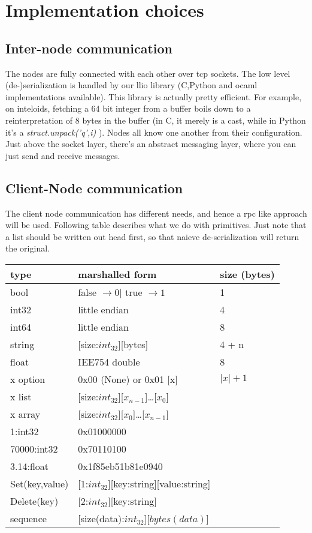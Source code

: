 \section{Implementation choices}
\subsection{Inter-node communication}
The nodes are fully connected with each other over tcp sockets.
The low level (de-)serialization is handled by our llio library (C,Python and ocaml implementations available).
This library is actually pretty efficient.
For example, on inteloids, fetching a 64 bit integer from a buffer boils down to a reinterpretation of 8 bytes in the buffer (in C, it merely is a cast, while in Python it's a \emph{struct.unpack('q',i)} ).
Nodes all know one another from their configuration.
Just above the socket layer, there's an abstract messaging layer, where you can just send and receive messages.



\subsection{Client-Node communication}
The client node communication has different needs, and hence a rpc like approach will be used. Following table describes what we do with primitives.
Just note that a list should be written out head first, so that naieve de-serialization will return the original.
\begin{table}[ht]
\begin{tabular}{|l|l|l|}
\hline
type  &   marshalled form & size (bytes)          \\
\hline
bool        & false $\rightarrow 0 | $ true $ \rightarrow 1   $ & 1 \\
int32       & little endian          & 4             \\
int64       & little endian          & 8             \\
string      & [size:$int_{32}$][bytes] & 4 + n     \\
float       & IEE754 double       & 8             \\
x option    & 0x00 (None) or 0x01 [x] & $|x| + 1$ \\
x list      & [size:$int_{32}$][$x_{n-1}$]\ldots[$x_{0}$]       &\\
x array     & [size:$int_{32}$][$x_{0}$]\ldots[$x_{n-1}$]       &\\
\hline 
1:int32     & 0x01000000         & \\
70000:int32 & 0x70110100         & \\
3.14:float  & 0x1f85eb51b81e0940 & \\
\hline 
Set(key,value) & [1:$int_{32}$][key:string][value:string] & \\
Delete(key) & [2:$int_{32}$][key:string]                  & \\
sequence    & [size(data):$int_{32}$][$bytes(data)$]      & \\

\hline
\end{tabular}
\end{table}

